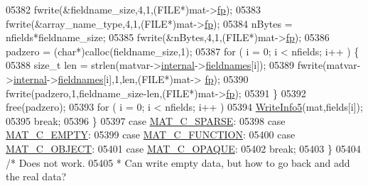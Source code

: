 \begin{DoxyCode}
{{{{{{{{{{{{{{{{{{{{{{{{{{{{{{{05382                 fwrite(&fieldname\_size,4,1,(FILE*)mat->\hyperlink{struct__mat__t_a85f562e407ca9ad4d2a6e14f839432b7}{fp});
05383                 fwrite(&array\_name\_type,4,1,(FILE*)mat->\hyperlink{struct__mat__t_a85f562e407ca9ad4d2a6e14f839432b7}{fp});
05384                 nBytes = nfields*fieldname\_size;
05385                 fwrite(&nBytes,4,1,(FILE*)mat->\hyperlink{struct__mat__t_a85f562e407ca9ad4d2a6e14f839432b7}{fp});
05386                 padzero = (\textcolor{keywordtype}{char}*)calloc(fieldname\_size,1);
05387                 \textcolor{keywordflow}{for} ( i = 0; i < nfields; i++ ) \{
05388                     \textcolor{keywordtype}{size\_t} len = strlen(matvar->\hyperlink{group___m_a_t_a6e97e3ed9f40c49322c18561c2a94e92}{internal}->\hyperlink{structmatvar__internal_a7574d000bfc98ad4860ae6590b8d4985}{fieldnames}[i]);
05389                     fwrite(matvar->\hyperlink{group___m_a_t_a6e97e3ed9f40c49322c18561c2a94e92}{internal}->\hyperlink{structmatvar__internal_a7574d000bfc98ad4860ae6590b8d4985}{fieldnames}[i],1,len,(FILE*)mat->
      \hyperlink{struct__mat__t_a85f562e407ca9ad4d2a6e14f839432b7}{fp});
05390                     fwrite(padzero,1,fieldname\_size-len,(FILE*)mat->\hyperlink{struct__mat__t_a85f562e407ca9ad4d2a6e14f839432b7}{fp});
05391                 \}
05392                 free(padzero);
05393                 \textcolor{keywordflow}{for} ( i = 0; i < nfields; i++ )
05394                     \hyperlink{mat5_8c_a80e4ba45ec110d05657f8f39ffd9ee27}{WriteInfo5}(mat,fields[i]);
05395                 \textcolor{keywordflow}{break};
05396             \}
05397             \textcolor{keywordflow}{case} \hyperlink{group___m_a_t_ggad4d60ae7b709fc81bfd744fb4c857c40a0d5655b7e6178a2242cb3bb56ff4c8d2}{MAT\_C\_SPARSE}:
05398             \textcolor{keywordflow}{case} \hyperlink{group___m_a_t_ggad4d60ae7b709fc81bfd744fb4c857c40a5c76eef0ca0373d25abe49053be6fa9a}{MAT\_C\_EMPTY}:
05399             \textcolor{keywordflow}{case} \hyperlink{group___m_a_t_ggad4d60ae7b709fc81bfd744fb4c857c40aaa9bf08312779cd1ab8e504a162ddcea}{MAT\_C\_FUNCTION}:
05400             \textcolor{keywordflow}{case} \hyperlink{group___m_a_t_ggad4d60ae7b709fc81bfd744fb4c857c40afe45104b68b044c83a2f99e349fa1ea6}{MAT\_C\_OBJECT}:
05401             \textcolor{keywordflow}{case} \hyperlink{group___m_a_t_ggad4d60ae7b709fc81bfd744fb4c857c40ad83c684d250e463c1a3779647695c0c9}{MAT\_C\_OPAQUE}:
05402                 \textcolor{keywordflow}{break};
05403         \}
05404     \textcolor{comment}{/* Does not work.}
05405 \textcolor{comment}{     * Can write empty data, but how to go back and add the real data?}
}}}}}}}}}}}}}}}}}}}}}}}}}}}}}}}
\end{DoxyCode}
